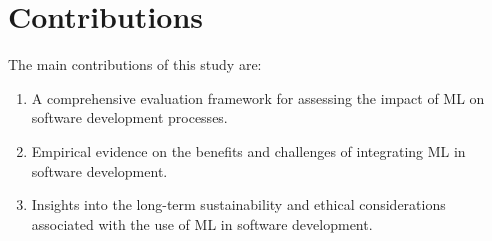 \documentclass{article}
\begin{document}
\section{Contributions}
The main contributions of this study are:
\begin{enumerate}
    \item A comprehensive evaluation framework for assessing the impact of ML on software development processes.
    \item Empirical evidence on the benefits and challenges of integrating ML in software development.
    \item Insights into the long-term sustainability and ethical considerations associated with the use of ML in software development.
\end{enumerate}



\end{document}
